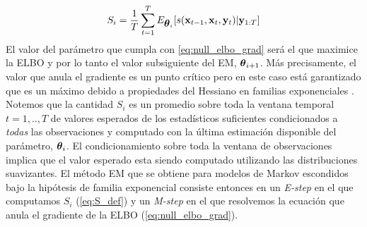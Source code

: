 \begin{align} \label{eq:S_def}
    S_i = \frac{1}{T}\sum_{t=1}^T E_{\mbox{\boldmath$ \theta $}_i} [s(\mathbf{x}_{t-1}, \mathbf{x}_t, \mathbf{y}_t) | \mathbf{y}_{1:T}]
\end{align}
El valor del parámetro que cumpla con \ref{eq:null_elbo_grad} será el que maximice la ELBO y por lo tanto el valor subsiguiente del EM, $\mbox{\boldmath$ \theta $}_{i+1}$. Más precisamente, el valor que anula el gradiente es un punto crítico pero en este caso está garantizado que es un máximo debido a propiedades del Hessiano en familias exponenciales \citep{Wainwright2008}. Notemos que la cantidad $S_i$ es un promedio sobre toda la ventana temporal $t=1, .., T$ de valores esperados de los estadísticos suficientes condicionados a \textit{todas} las observaciones y computado con la última estimación disponible del parámetro, $\mbox{\boldmath$ \theta $}_i$. El condicionamiento sobre toda la ventana de observaciones implica que el valor esperado esta siendo computado utilizando las distribuciones suavizantes. El método EM que se obtiene para modelos de Markov escondidos bajo la hipótesis de familia exponencial consiste entonces en un \textit{E-step} en el que computamos $S_i$ (\ref{eq:S_def}) y un \textit{M-step} en el que resolvemos la ecuación que anula el gradiente de la ELBO (\ref{eq:null_elbo_grad}).

